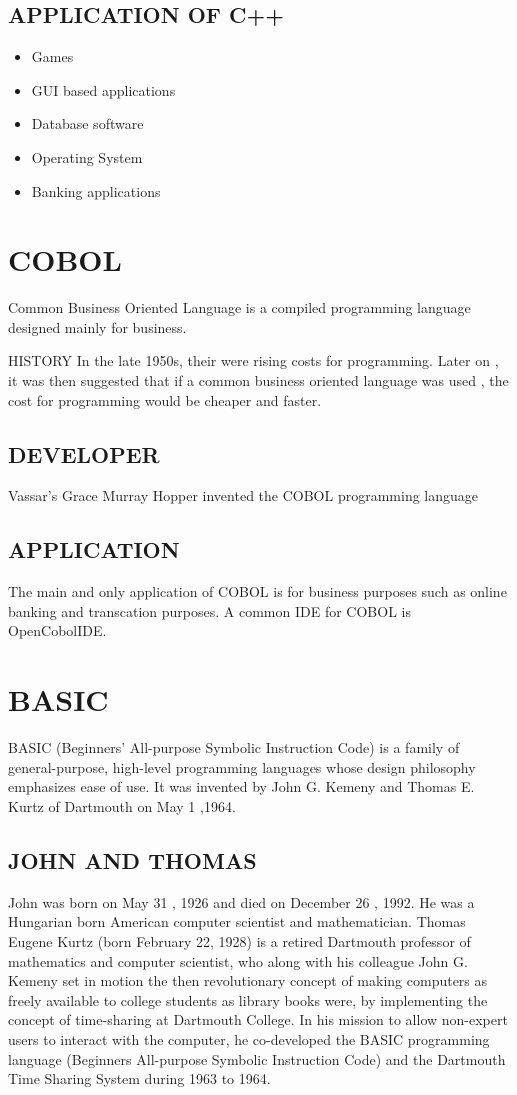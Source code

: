\documentclass{article}
\begin{document}
		\subsection{APPLICATION OF C++}
		 \begin{itemize}
			\item Games
			\item GUI based applications
			\item Database software
			\item Operating System
			\item Banking applications
		\end{itemize}
		
		\section{COBOL}
		
	Common Business Oriented Language is a compiled programming language designed mainly for business.

HISTORY
In the late 1950s, their were rising costs for programming. Later on , it was then suggested that if a common business oriented language was used , the cost for programming would be cheaper and faster. 

\subsection{DEVELOPER}
Vassar’s Grace Murray Hopper invented the COBOL programming language  

\subsection{APPLICATION}
The main and only application of COBOL is for business purposes such as online banking and transcation purposes.
A common IDE for COBOL is OpenCobolIDE.

\section{BASIC}
	BASIC (Beginners' All-purpose Symbolic Instruction Code) is a family of general-purpose, high-level programming languages whose design philosophy emphasizes ease of use. 
It was invented by John G. Kemeny and Thomas E. Kurtz of Dartmouth on May 1 ,1964.

\subsection{JOHN AND THOMAS}
John was born on May 31 , 1926 and died on December 26 , 1992. He was a Hungarian born American computer scientist and mathematician.
Thomas Eugene Kurtz (born February 22, 1928) is a retired Dartmouth professor of mathematics and computer scientist, who along with his colleague John G. Kemeny set in motion the then revolutionary concept of making computers as freely available to college students as library books were, by implementing the concept of time-sharing at Dartmouth College. In his mission to allow non-expert users to interact with the computer, he co-developed the BASIC programming language (Beginners All-purpose Symbolic Instruction Code) and the Dartmouth Time Sharing System during 1963 to 1964.
\end{document}
